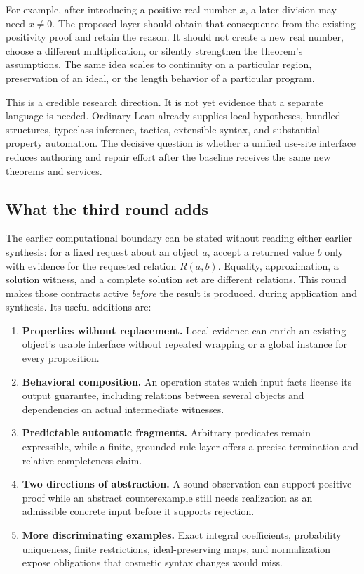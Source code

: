 \documentclass[11pt,letterpaper]{article}
\theoremstyle{definition}\newtheorem{definition}[proposition]{Definition}
\theoremstyle{remark}\newtheorem{remark}[proposition]{Remark}
\begin{document}
For example, after introducing a positive real number $x$, a later division may
need $x\ne0$. The proposed layer should obtain that consequence from the existing
positivity proof and retain the reason. It should not create a new real number,
choose a different multiplication, or silently strengthen the theorem's
assumptions. The same idea scales to continuity on a particular region,
preservation of an ideal, or the length behavior of a particular program.

This is a credible research direction. It is not yet evidence that a separate
language is needed. Ordinary Lean already supplies local hypotheses, bundled
structures, typeclass inference, tactics, extensible syntax, and substantial
property automation. The decisive question is whether a unified use-site
interface reduces authoring and repair effort after the baseline receives the
same new theorems and services.

\subsection{What the third round adds}
The earlier computational boundary can be stated without reading either earlier
synthesis: for a fixed request about an object $a$, accept a returned value $b$
only with evidence for the requested relation $R(a,b)$. Equality, approximation,
a solution witness, and a complete solution set are different relations. This
round makes those contracts active \emph{before} the result is produced, during
application and synthesis. Its useful additions are:

\begin{enumerate}
\item \textbf{Properties without replacement.} Local evidence can enrich an
existing object's usable interface without repeated wrapping or a global
instance for every proposition.
\item \textbf{Behavioral composition.} An operation states which input facts
license its output guarantee, including relations between several objects and
dependencies on actual intermediate witnesses.
\item \textbf{Predictable automatic fragments.} Arbitrary predicates remain
expressible, while a finite, grounded rule layer offers a precise termination
and relative-completeness claim.
\item \textbf{Two directions of abstraction.} A sound observation can support
positive proof while an abstract counterexample still needs realization as an
admissible concrete input before it supports rejection.
\item \textbf{More discriminating examples.} Exact integral coefficients,
probability uniqueness, finite restrictions, ideal-preserving maps, and
normalization expose obligations that cosmetic syntax changes would miss.
\end{enumerate}
\end{document}
